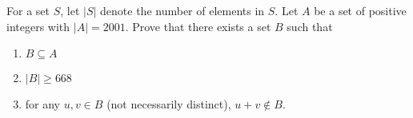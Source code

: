 For a set $S$, let $\left|S\right|$ denote the number of elements in $S$. Let $A$ be a set of positive integers with $\left|A\right|=2001$. Prove that there exists a set $B$ such that
\begin{enumerate}[label=(\roman*)]
	\item $B\subseteq A$
	\item $\left|B\right|\geq668$
	\item for any $u,v\in B$ (not necessarily distinct), $u+v\notin B$.
\end{enumerate}
